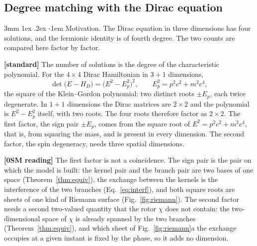 \documentclass[%
 reprint, amsmath,amssymb, aps, prb, ]{revtex4-2}
\makeatletter
\numberwithin{equation}{section}
\renewcommand\paragraph{%
  \@startsection{paragraph}{4}{\z@}%
    {3mm \@plus 1ex \@minus .2ex}%
    {-1em}%
    {\normalfont\normalsize\itshape}}
\makeatother
\begin{document}
\subsection{Degree matching with the Dirac equation}

\paragraph{Motivation.} The Dirac equation in three dimensions has four solutions, and the fermionic identity is of fourth degree. The two counts are compared here factor by factor.

\textbf{[standard]} The number of solutions is the degree of the characteristic polynomial. For the $4\times4$ Dirac Hamiltonian in $3+1$ dimensions,
\begin{equation}
\det\!\big(E-H_D\big)=\big(E^2-E_p^2\big)^2,\qquad E_p^2=p^2c^2+m^2c^4 ,
\label{eq:charpoly}
\end{equation}
the square of the Klein--Gordon polynomial: two distinct roots $\pm E_p$, each twice degenerate. In $1+1$ dimensions the Dirac matrices are $2\times2$ and the polynomial is $E^2-E_p^2$ itself, with two roots. The four roots therefore factor as $2\times2$. The first factor, the sign pair $\pm E_p$, comes from the square root of $E^2=p^2c^2+m^2c^4$, that is, from squaring the mass, and is present in every dimension. The second factor, the spin degeneracy, needs three spatial dimensions.

\textbf{[0SM reading]} The first factor is not a coincidence. The sign pair is the pair on which the model is built: the kernel pair and the branch pair are two bases of one space (Theorem~\ref{thm:equiv}), the exchange between the kernels is the interference of the two branches (Eq.~\eqref{eq:interf}), and both square roots are sheets of one kind of Riemann surface (Fig.~\ref{fig:riemann}). The second factor needs a second two-valued quantity that the rotor $\chi$ does not contain: the two-dimensional space of $\chi$ is already spanned by the two branches (Theorem~\ref{thm:equiv}), and which sheet of Fig.~\ref{fig:riemann}a the exchange occupies at a given instant is fixed by the phase, so it adds no dimension.
\end{document}
